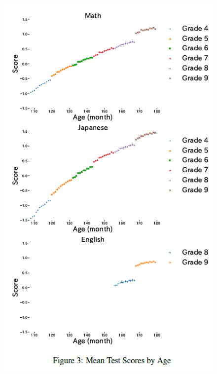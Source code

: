 \documentclass[../root]{subfiles}
\begin{document}
    \begin{figure}[ht]
      \centering
      \includegraphics[scale = 1]{0904tanji/F3}

\end{figure}
\end{document}
